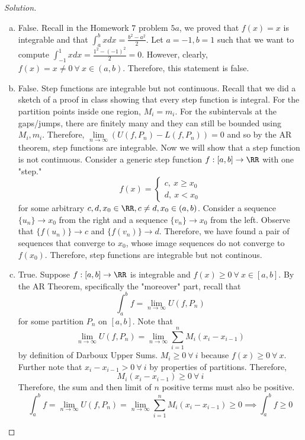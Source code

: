 \documentclass[12pt]{scrartcl}
\begin{document}
\begin{proof}[Solution]

\hfill

\begin{enumerate}[a.]
  \item False. Recall in the Homework $7$ problem $5a$, we proved that $f(x) = x$
  is integrable and that $\int_a^b x dx = \frac{b^2 - a^2}{2}$. Let $a=-1, b=1$ such that 
  we want to compute $\int_{-1}^1 x dx = \frac{1^2 - (-1)^2}{2} = 0$. However, clearly, $f(x) = x \neq 0 \ \forall \ x \in (a, b)$.
  Therefore, this statement is false.
  
  \item False. Step functions are integrable but not continuous. Recall that we did a sketch of a proof in class showing that every step function is integral. 
  For the partition points inside one region, $M_i = m_i$. For the subintervals at the gaps/jumps, there are finitely many and they 
  can still be bounded using $M_i, m_i$. Therefore, $\underset{n\to\infty}{\lim}(U(f, P_n) - L(f, P_n)) = 0$ and so by the AR theorem, 
  step functions are integrable. Now we will show that a step function is not continuous. Consider a generic step function $f: [a,b] \to \RR$ with one "step."
  \[f(x) = \begin{cases}
    c, \ x \geq x_0\\
    d, \ x < x_0
  \end{cases}\]
  for some arbitrary $c, d, x_0 \in \RR, c \neq d, x_0 \in (a, b)$. Consider a sequence $\{u_n\} \to x_0$ from the right and a sequence 
  $\{v_n\} \to x_0$ from the left. Observe that $\{f(u_n)\} \to c$ and $\{f(v_n)\} \to d$. Therefore, we have found a pair of sequences that converge 
  to $x_0$, whose image sequences do not converge to $f(x_0)$. Therefore, step functions are integrable but not continous.
  \item True. Suppose $f: [a,b] \to \RR$ is integrable and $f(x) \geq 0 \ \forall \ x \in [a,b]$.
  By the AR Theorem, specifically the "moreover" part, recall that 
  \[\int_a^b f = \lim_{n\to\infty} U(f, P_n)\]
  for some partition $P_n$ on $[a,b]$. Note that 
  \[\lim_{n\to\infty}U(f, P_n) = \lim_{n\to\infty} \sum_{i=1}^n M_i(x_i - x_{i-1})\]
  by definition of Darboux Upper Sums. $M_i \geq 0 \ \forall \ i$ because $f(x) \geq 0 \ \forall \ x$. Further note that 
  $x_i - x_{i-1} > 0 \ \forall \ i$ by properties of partitions. Therefore, 
  \[M_i(x_i - x_{i-1}) \geq 0 \ \forall \ i\]
  Therefore, the sum and then limit of $n$ positive terms must also be positive.
  \[\int_a^b f = \lim_{n\to\infty}U(f, P_n) = \lim_{n\to\infty} \sum_{i=1}^n M_i(x_i - x_{i-1}) \geq 0 \implies \int_a^b f \geq 0\]
  

\end{enumerate}
\end{proof}
\end{document}
